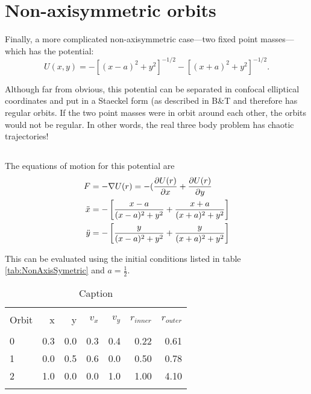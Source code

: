 \section{Non-axisymmetric orbits}

Finally, a more complicated non-axisymmetric case—two fixed point
masses—which has the potential:
\begin{equation}
    U(x,y) = -[(x-a)^2 +y^2]^{-1/2} -[(x+a)^2 +y^2]^{-1/2}.
\end{equation}

Although far from obvious, this potential can be separated in confocal
elliptical coordinates and put in a Staeckel form (as described in B\&T
and therefore has regular orbits. If the two point masses were in orbit
around each other, the orbits would not be regular. In other words, the
real three body problem has chaotic trajectories!
\subsection{}

The equations of motion for this potential are
\begin{align*}
    F&=-\nabla U(r) =-(\frac{\partial U(r)}{\partial x}+\frac{\partial U(r)}{\partial y}\\
    \Ddot{x}&=-\left[\frac{x-a}{(x-a)^2+y^2}+\frac{x+a}{(x+a)^2+y^2}\right] \\
    \Ddot{y}&=- \left[\frac{y}{(x-a)^2+y^2}+\frac{y}{(x+a)^2+y^2}\right]
\end{align*}

This can be evaluated using the initial conditions listed in table \ref{tab:NonAxisSymetric} and $a= \frac{1}{2}$.

\begin{table}[]
    \centering
    \begin{tabular}{lrrrrrr}
    \toprule \\
    Orbit &    x &    y &  $v_x$ &  $v_y$ &  $r_{inner}$ &  $r_{outer}$\\
    \midrule \\
    0 &  0.3 &  0.0 &  0.3 &  0.4 &    0.22 &   0.61 \\
    1 &  0.0 &  0.5 &  0.6 &  0.0 &    0.50 &   0.78 \\
    2 &  1.0 &  0.0 &  0.0 &  1.0 &    1.00 &   4.10 \\
    \bottomrule\\
    \end{tabular}
    \caption{Caption}
    \label{tab:my_label}
\end{table}

